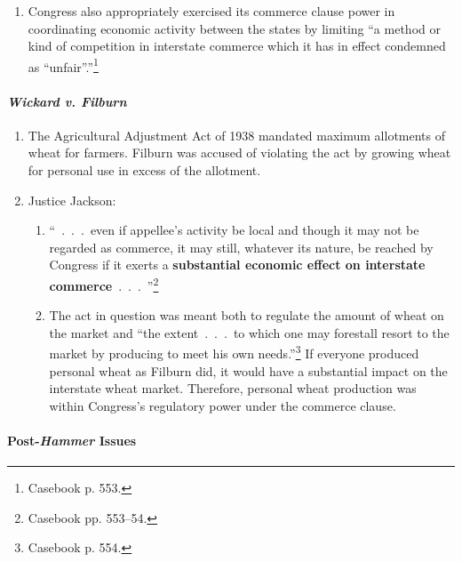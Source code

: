 \begin{enumerate}
\begin{enumerate}
        the prohibited product, but also to ``stop the initial step toward 
        transportation, production with the purpose of so transporting 
        it.''\footnote{Casebook p. 552.} Such regulation was within Congress's 
        power.
        \item Congress also appropriately exercised its commerce clause power 
        in coordinating economic activity between the states by limiting ``a 
        method or kind of competition in interstate commerce which it has in 
        effect condemned as \enquote{unfair}.''\footnote{Casebook p. 553.}
    \end{enumerate}
\end{enumerate}

\paragraph{\emph{Wickard v. Filburn}}

\begin{enumerate}
    \item The Agricultural Adjustment Act of 1938 mandated maximum allotments 
    of wheat for farmers. Filburn was accused of violating the act by growing 
    wheat for personal use in excess of the allotment.
    \item Justice Jackson:
    \begin{enumerate}
        \item ``~.~.~.~even if appellee's activity be local and though it may 
        not be regarded as commerce, it may still, whatever its nature, be 
        reached by Congress if it exerts a \textbf{substantial economic effect 
        on interstate commerce}~.~.~.~''\footnote{Casebook pp. 553--54.}
        \item The act in question was meant both to regulate the amount of 
        wheat on the market and ``the extent~.~.~.~to which one may forestall 
        resort to the market by producing to meet his own 
        needs.''\footnote{Casebook p. 554.} If everyone produced personal 
        wheat as Filburn did, it would have a substantial impact on the 
        interstate wheat market. Therefore, personal wheat production was 
        within Congress's regulatory power under the commerce clause.
    \end{enumerate}
\end{enumerate}

\paragraph{Post-\emph{Hammer} Issues}

